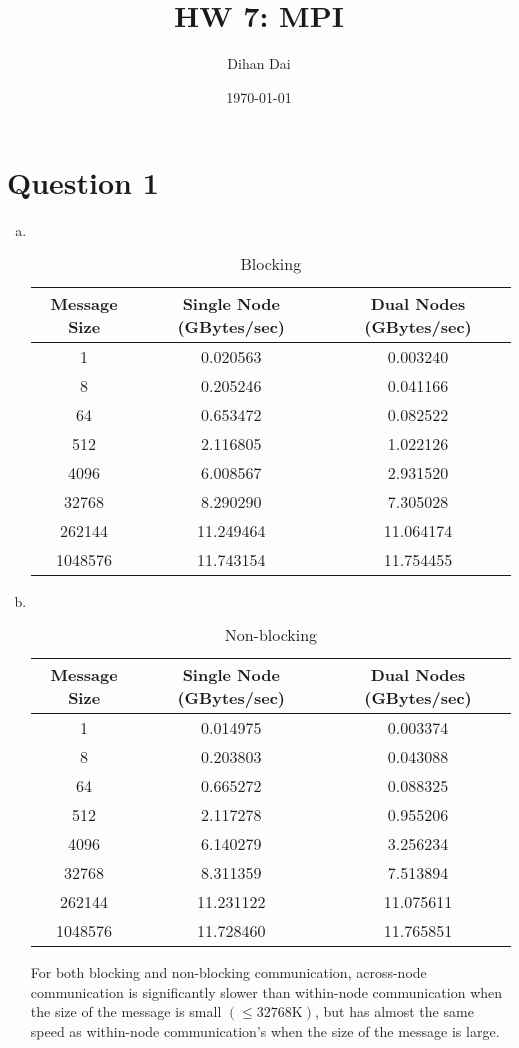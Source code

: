 \documentclass[11pt]{amsart}
\title{HW 7: MPI}
\author{Dihan Dai}
\date{\today}
\begin{document}
\maketitle
\section*{Question 1}
\begin{enumerate}[(a)]
\item $\quad$

\begin{table}[h]
  \centering
  \caption{Blocking}
	\begin{tabular}{|c|c|c|}
		\hline
    Message Size&Single Node (GBytes/sec)& Dual Nodes (GBytes/sec)\\
    \hline
    1&0.020563&0.003240\\
    8&0.205246&0.041166\\
    64&0.653472&0.082522\\
    512&2.116805&1.022126\\
    4096&6.008567&2.931520\\
    32768&8.290290&7.305028\\
    262144&11.249464&11.064174\\
    1048576&11.743154&11.754455\\
    \hline
	\end{tabular}
\end{table}
\item $\quad$
\begin{table}[h]
  \centering
  \caption{Non-blocking}
	\begin{tabular}{|c|c|c|}
		\hline
    Message Size&Single Node (GBytes/sec)& Dual Nodes (GBytes/sec)\\
    \hline
    1&0.014975&0.003374\\
    8&0.203803&0.043088\\
    64&0.665272&0.088325\\
    512&2.117278&0.955206\\
    4096&6.140279&3.256234\\
    32768&8.311359&7.513894\\
    262144&11.231122&11.075611\\
    1048576&11.728460&11.765851\\
    \hline
	\end{tabular}
\end{table}

For both blocking and non-blocking communication, across-node communication is significantly slower than within-node communication when the size of the message is small $(\le 32768\text{K})$, but has almost the same speed as within-node communication's when the size of the message is large.
\end{enumerate}
\newpage
\end{document}
